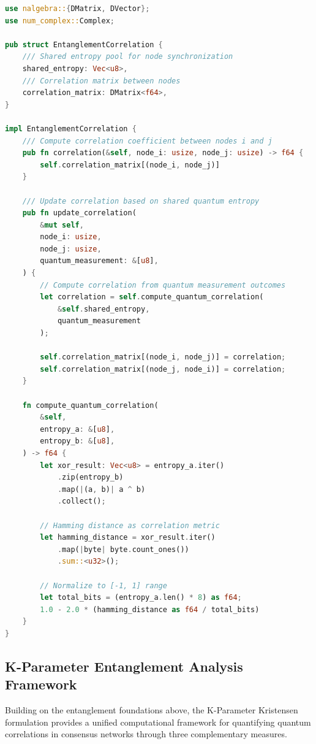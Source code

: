 \documentclass[11pt,a4paper]{article}
\begin{document}
\begin{lstlisting}[language=Rust, caption=Entanglement-Inspired State Correlation]
use nalgebra::{DMatrix, DVector};
use num_complex::Complex;

pub struct EntanglementCorrelation {
    /// Shared entropy pool for node synchronization
    shared_entropy: Vec<u8>,
    /// Correlation matrix between nodes
    correlation_matrix: DMatrix<f64>,
}

impl EntanglementCorrelation {
    /// Compute correlation coefficient between nodes i and j
    pub fn correlation(&self, node_i: usize, node_j: usize) -> f64 {
        self.correlation_matrix[(node_i, node_j)]
    }

    /// Update correlation based on shared quantum entropy
    pub fn update_correlation(
        &mut self,
        node_i: usize,
        node_j: usize,
        quantum_measurement: &[u8],
    ) {
        // Compute correlation from quantum measurement outcomes
        let correlation = self.compute_quantum_correlation(
            &self.shared_entropy,
            quantum_measurement
        );

        self.correlation_matrix[(node_i, node_j)] = correlation;
        self.correlation_matrix[(node_j, node_i)] = correlation;
    }

    fn compute_quantum_correlation(
        &self,
        entropy_a: &[u8],
        entropy_b: &[u8],
    ) -> f64 {
        let xor_result: Vec<u8> = entropy_a.iter()
            .zip(entropy_b)
            .map(|(a, b)| a ^ b)
            .collect();

        // Hamming distance as correlation metric
        let hamming_distance = xor_result.iter()
            .map(|byte| byte.count_ones())
            .sum::<u32>();

        // Normalize to [-1, 1] range
        let total_bits = (entropy_a.len() * 8) as f64;
        1.0 - 2.0 * (hamming_distance as f64 / total_bits)
    }
}
\end{lstlisting}

\subsection{K-Parameter Entanglement Analysis Framework}

Building on the entanglement foundations above, the K-Parameter Kristensen formulation \cite{k-parameter-entanglement} provides a unified computational framework for quantifying quantum correlations in consensus networks through three complementary measures.
\end{document}
